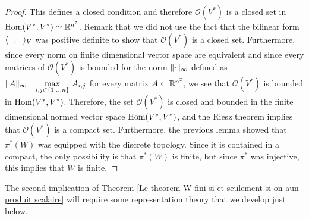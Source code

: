\begin{proof}
	 This defines a closed condition and therefore $\mathcal{O}(V^*)$ is a closed set in $\operatorname{Hom}(V^*,V^*)\simeq\mathbb R^{n^2}$. Remark that we did not use the fact that the bilinear form $\langle\text{ } \text{ },\text{ }\text{ }\rangle_V$ was positive definite to show that $\mathcal{O}(V^*)$ is a closed set. Furthermore, since every norm on finite dimensional vector space are equivalent and since every matrices of $\mathcal{O}(V^*)$ is bounded for the norm $\lVert \cdot \lVert_{\infty}$ defined as $\lVert A \lVert_{\infty}=\underset{i,j\in \{1,..,n\}}{\mbox{max}}\text{ } A_{i,j}$ for every matrix $A\subset \mathbb R^{n^2}$, we see that $\mathcal{O}(V^*)$ is bounded in $\operatorname{Hom}(V^*,V^*)$. Therefore, the set $\mathcal{O}(V^*)$ is closed and bounded in the finite dimensional normed vector space $\operatorname{Hom}(V^*,V^*)$, and the Riesz theorem implies that $\mathcal{O}(V^*)$ is a compact set. Furthermore, the previous lemma showed that $\pi^*(W)$ was equipped with the discrete topology. Since it is contained in a compact, the only possibility is that $\pi^*(W)$ is finite, but since $\pi^*$ was injective, this implies that $W$ is finite.
\end{proof}
The second implication of Theorem \ref{Le theorem W fini si et seulement si on  aun produit scalaire} will require some representation theory that we develop just below.

